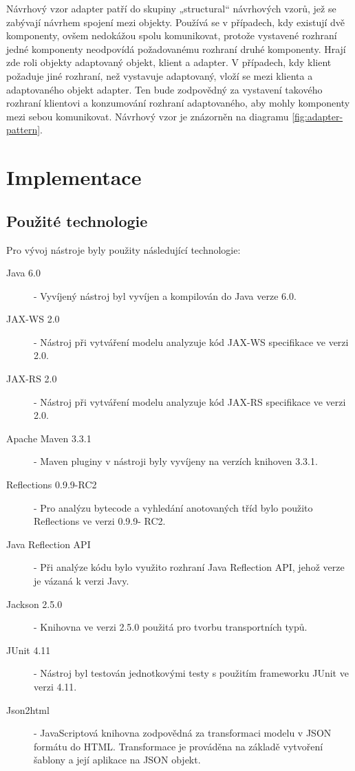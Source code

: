 \documentclass[11pt,twoside,a4paper]{book}
\begin{document}
Návrhový vzor adapter patří do skupiny „structural“ návrhových vzorů, jež se
zabývají návrhem spojení mezi objekty. Používá se v případech, kdy existují dvě
komponenty, ovšem nedokážou spolu komunikovat, protože vystavené rozhraní jedné
komponenty neodpovídá požadovanému rozhraní druhé komponenty. Hrají zde roli
objekty adaptovaný objekt, klient a adapter. V případech, kdy klient požaduje
jiné rozhraní, než vystavuje adaptovaný, vloží se mezi klienta a adaptovaného
objekt adapter. Ten bude zodpovědný za vystavení takového rozhraní klientovi a
konzumování rozhraní adaptovaného, aby mohly komponenty mezi sebou komunikovat.
Návrhový vzor je znázorněn na diagramu \ref{fig:adapter-pattern}.

\chapter{Implementace}

\section{Použité technologie}

Pro vývoj nástroje byly použity následující technologie:
\begin{description}
\item[Java 6.0 \cite{JavaHome}] - Vyvíjený nástroj byl vyvíjen a kompilován do Java
verze 6.0.
\item[JAX-WS 2.0 \cite{JAXWS20}]- Nástroj při vytváření modelu analyzuje kód JAX-WS
specifikace ve verzi 2.0.
\item[JAX-RS 2.0 \cite{JAXRS20}] - Nástroj při vytváření modelu analyzuje kód JAX-RS
specifikace ve verzi 2.0.
\item[Apache Maven 3.3.1 \cite{MavenHome}] - Maven pluginy v nástroji byly vyvíjeny na
verzích knihoven 3.3.1.
\item[Reflections 0.9.9-RC2 \cite{ReflectionsHome}] - Pro analýzu bytecode a vyhledání
anotovaných tříd bylo použito Reflections ve verzi 0.9.9- RC2.
\item[Java Reflection API] - Při analýze kódu bylo využito rozhraní
Java Reflection API, jehož verze je vázaná k verzi Javy.
\item[Jackson 2.5.0 \cite{JacksonHome}] - Knihovna ve verzi 2.5.0 použitá pro tvorbu
transportních typů.
\item[JUnit 4.11 \cite{JUnitHome}] - Nástroj byl testován jednotkovými testy s
použitím frameworku JUnit ve verzi 4.11.
\item[Json2html \cite{JSON2HTMLHome}] - JavaScriptová knihovna zodpovědná za transformaci
modelu v JSON formátu do HTML. Transformace je prováděna na základě vytvoření šablony a její aplikace na JSON objekt.
\end{description}
\end{document}
